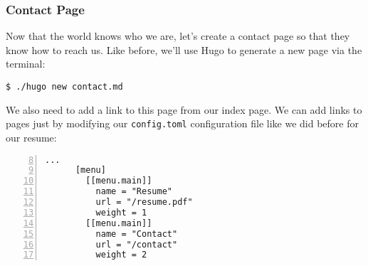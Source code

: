 \begin{frame}[fragile]
    \frametitle{Contact Page}

    Now that the world knows who we are, let's create a contact page so that they know how to reach us.
    Like before, we'll use Hugo to generate a new page via the terminal:

    \medskip

    \begin{lstlisting}[style=saneCode,gobble=6]
      $ ./hugo new contact.md
    \end{lstlisting}

    \vfill

    We also need to add a link to this page from our index page. We can add links to pages just by modifying our 
    \texttt{config.toml} configuration file like we did before for our resume:

    \begin{lstlisting}[style=saneCode,gobble=6,title={config.toml},numbers=left,firstnumber=8]
      ...
      [menu]
        [[menu.main]]
          name = "Resume"
          url = "/resume.pdf"
          weight = 1
        [[menu.main]]
          name = "Contact"
          url = "/contact"
          weight = 2
    \end{lstlisting}
\end{frame}